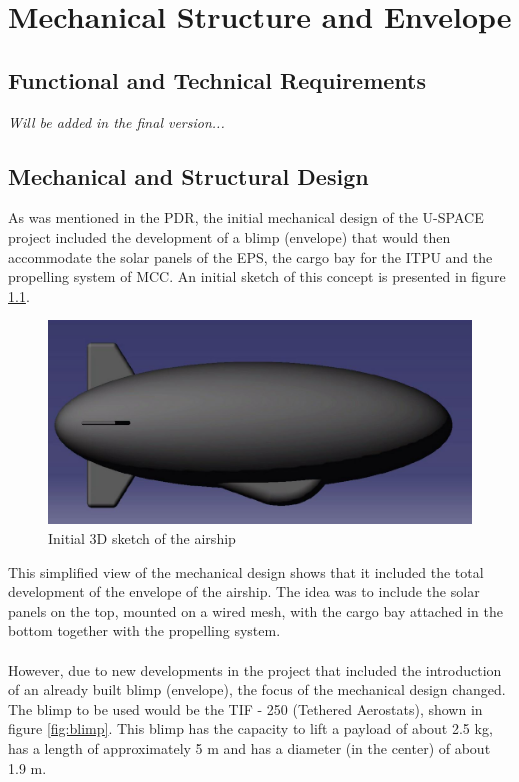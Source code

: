 \chapter{Mechanical Structure and Envelope}
\label{chap:mse}


\section{Functional and Technical Requirements}

\textit{Will be added in the final version...}

\section{Mechanical and Structural Design}

As was mentioned in the \ac{PDR}, the initial mechanical design of the \ac{U-SPACE} project included the development of a blimp (envelope) that would then accommodate the solar panels of the \ac{EPS}, the cargo bay for the \ac{ITPU} and the propelling system of \ac{MCC}. An initial sketch of this concept is presented in figure \ref{fig:init}.  

\begin{figure}[bht]
\centering
\includegraphics[scale=0.5]{figures/init.png}
\caption{Initial 3D sketch of the airship}
\label{fig:init}
\end{figure}

This simplified view of the mechanical design shows that it included the total development of the envelope of the airship. The idea was to include the solar panels on the top, mounted on a wired mesh, with the cargo bay attached in the bottom together with the propelling system.
\\
\\
However, due to new developments in the project that included the introduction of an already built blimp (envelope), the focus of the mechanical design changed. The blimp to be used would be the TIF - 250 (Tethered Aerostats), shown in figure \ref{fig:blimp}. This blimp has the capacity to lift a payload of about 2.5 kg, has a length of approximately 5 m and has a diameter (in the center) of about 1.9 m.

